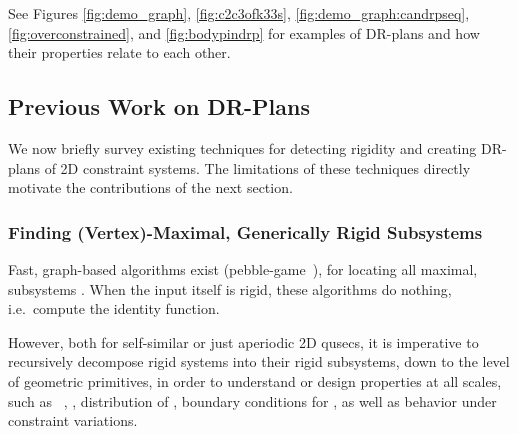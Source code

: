 See Figures \ref{fig:demo_graph}, \ref{fig:c2c3ofk33s}, \ref{fig:demo_graph:candrpseq},  \ref{fig:overconstrained}, and \ref{fig:bodypindrp} for examples of DR-plans and how their properties relate to each other.


\subsection{Previous Work on DR-Plans}
\label{sec:prev}
We now briefly survey existing techniques for detecting rigidity and creating DR-plans of 2D constraint systems. The limitations of these techniques directly motivate the contributions of the next  section.

\subsubsection{Finding (Vertex)-Maximal, Generically Rigid Subsystems}
Fast, graph-based algorithms exist (pebble-game~\cite{Jacobs:1997:PG,hoffmann1997solvablesubsets,jermann2006decomposition,Lee:2007:PGA}), for locating all maximal,  subsystems \seedefs. When the input itself is rigid, these algorithms do nothing, i.e.\ compute the identity function.

However, both for self-similar or just aperiodic 2D qusecs, it is imperative to recursively decompose rigid systems into their rigid subsystems, down to the level of geometric primitives, in order to understand or design properties at all scales, such as \seedefs\ , , distribution of , boundary conditions for , as well as behavior under constraint variations.

